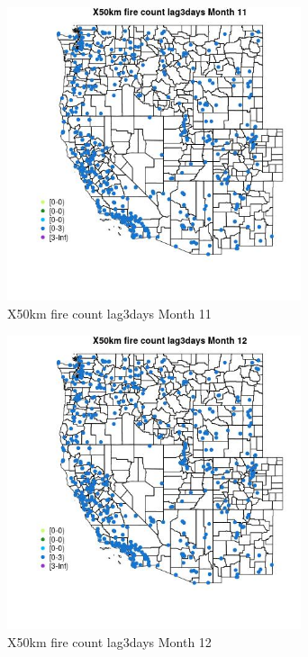 \begin{figure} 
\centering  
\includegraphics[width=0.77\textwidth]{Code_Outputs/Report_ML_input_PM25_Step4_part_e_de_duplicated_aves_compiled_2019-05-14wNAs_MapObsMo11X50km_fire_count_lag3days.jpg} 
\caption{\label{fig:Report_ML_input_PM25_Step4_part_e_de_duplicated_aves_compiled_2019-05-14wNAsMapObsMo11X50km_fire_count_lag3days}X50km fire count lag3days Month 11} 
\end{figure} 
 

\begin{figure} 
\centering  
\includegraphics[width=0.77\textwidth]{Code_Outputs/Report_ML_input_PM25_Step4_part_e_de_duplicated_aves_compiled_2019-05-14wNAs_MapObsMo12X50km_fire_count_lag3days.jpg} 
\caption{\label{fig:Report_ML_input_PM25_Step4_part_e_de_duplicated_aves_compiled_2019-05-14wNAsMapObsMo12X50km_fire_count_lag3days}X50km fire count lag3days Month 12} 
\end{figure} 
 

